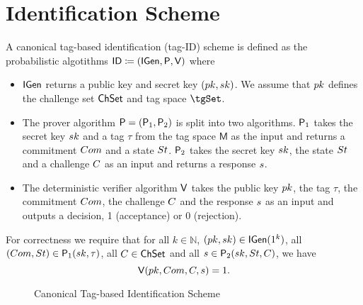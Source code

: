 \section{Identification Scheme}

\begin{definition}
A canonical tag-based  identification (tag-ID) scheme is defined as the probabilistic algotithms $\mathsf{ID} \coloneqq(\mathsf{IGen}, \mathsf{P}, \mathsf{V})$ where
\begin{itemize}
\item$\mathsf{IGen}$ returns a public key and secret key $(pk,sk)$. We assume that $pk$ defines the challenge set $\mathsf{ChSet}$ and tag space $\tgSet$.

\item The prover algorithm $\mathsf{P} = (\mathsf{P}_1,\mathsf{P}_2)$ is split into two algorithms. $\mathsf{P}_1$ takes the secret key $sk$ and a tag $\tau$ from the tag space $\mathsf{M}$ as the input and returns a commitment $Com$ and a state $St$. $\mathsf{P}_2$ takes the secret key $sk$, the state $St$ and a challenge $C$ as an input and returns a response $s$. 

\item The deterministic verifier algorithm $\mathsf{V}$ takes the public key $pk$, the tag $\tau$, the commitment $Com$, the challenge $C$ and the response $s$ as an input and outputs a decision, 1 (acceptance) or 0 (rejection).
\end{itemize}
For correctness we require that for all $k \in \mathbb{N}$,
$(pk,sk) \in \mathsf{IGen}(1^k)$,
all
$(Com,St) \in \mathsf{P}_1(sk, \tau)$,
all $C \in \mathsf{ChSet}$ and all 
$s \in \mathsf{P}_2(sk,St,C)$,
we have
$$ \mathsf{V}(pk,Com,C,s) = 1.$$
\begin{figure}[H]
  \centering
   \nicoresetlinenr
\vspace{2em}
  \caption{Canonical Tag-based Identification Scheme}
 \end{figure}

\end{definition}



